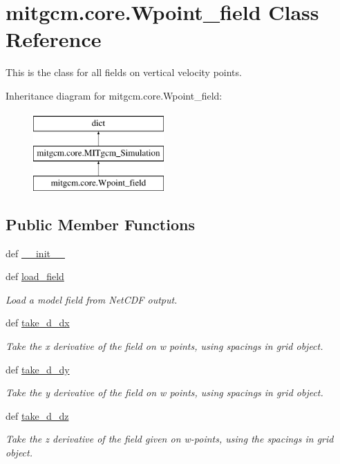 \hypertarget{classmitgcm_1_1core_1_1Wpoint__field}{\section{mitgcm.\+core.\+Wpoint\+\_\+field Class Reference}
\label{classmitgcm_1_1core_1_1Wpoint__field}
}


This is the class for all fields on vertical velocity points.  


Inheritance diagram for mitgcm.\+core.\+Wpoint\+\_\+field\+:\begin{figure}[H]
\begin{center}
\leavevmode
\includegraphics[height=3.000000cm]{classmitgcm_1_1core_1_1Wpoint__field}
\end{center}
\end{figure}
\subsection*{Public Member Functions}
\begin{DoxyCompactItemize}
\item 
def \hyperlink{classmitgcm_1_1core_1_1Wpoint__field_a5149dd8a1c832999bdbcd60b4abc3b14}{\+\_\+\+\_\+init\+\_\+\+\_\+}
\item 
def \hyperlink{classmitgcm_1_1core_1_1Wpoint__field_abc10b27c7fc6fd59b2e525485242d4c1}{load\+\_\+field}
\begin{DoxyCompactList}\small\item\em Load a model field from Net\+C\+D\+F output. \end{DoxyCompactList}\item 
def \hyperlink{classmitgcm_1_1core_1_1Wpoint__field_a3dae400759f1828507a317507dbf681b}{take\+\_\+d\+\_\+dx}
\begin{DoxyCompactList}\small\item\em Take the x derivative of the field on w points, using spacings in grid object. \end{DoxyCompactList}\item 
def \hyperlink{classmitgcm_1_1core_1_1Wpoint__field_a3874bb9811b39ed61b25de3ba3e3c39c}{take\+\_\+d\+\_\+dy}
\begin{DoxyCompactList}\small\item\em Take the y derivative of the field on w points, using spacings in grid object. \end{DoxyCompactList}\item 
def \hyperlink{classmitgcm_1_1core_1_1Wpoint__field_a3f7ffb2f1ed512712805bf78d8a8cde4}{take\+\_\+d\+\_\+dz}
\begin{DoxyCompactList}\small\item\em Take the z derivative of the field given on w-\/points, using the spacings in grid object. \end{DoxyCompactList}\end{DoxyCompactItemize}
